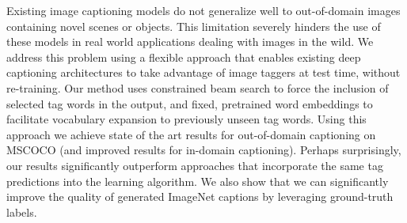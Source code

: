 Existing image captioning models do not generalize well to out-of-domain images containing novel scenes or objects. This limitation severely hinders the use of these models in real world applications dealing with images in the wild. We address this problem using a flexible approach that enables existing deep captioning architectures to take advantage of image taggers at test time, without re-training. Our method uses constrained beam search to force the inclusion of selected tag words in the output, and fixed, pretrained word embeddings to facilitate vocabulary expansion to previously unseen tag words. Using this approach we achieve state of the art results for out-of-domain captioning on MSCOCO (and improved results for in-domain captioning). Perhaps surprisingly, our results significantly outperform approaches that incorporate the same tag predictions into the learning algorithm. We also show that we can significantly improve the quality of generated ImageNet captions by leveraging ground-truth labels.
